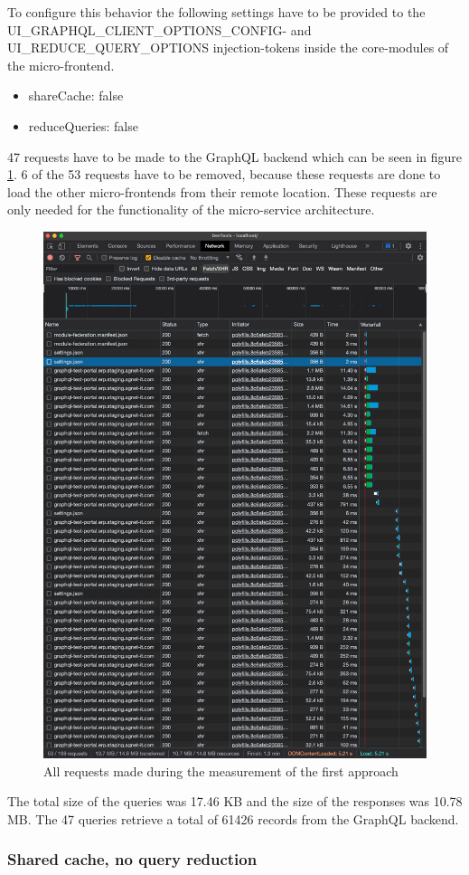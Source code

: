  To configure this behavior the following settings have to be provided to the UI\_GRAPHQL\_CLIENT\_OPTIONS\_CONFIG- and UI\_REDUCE\_QUERY\_OPTIONS injection-tokens inside the core-modules of the micro-frontend.

\begin{itemize}
    \item shareCache: false
    \item reduceQueries: false
\end{itemize}

47 requests have to be made to the GraphQL backend which can be seen in figure \ref{fig:results:no-shared-cache-no-reduction-chrome-dev-tools}. 6 of the 53 requests have to be removed, because these requests are done to load the other micro-frontends from their remote location. These requests are only needed for the functionality of the micro-service architecture.

\ifshowImages
\begin{figure}[H]
\centering
\includegraphics[width=0.6\linewidth]{images/1-attempt/no-shared-cache-no-reduction.png}
\caption{All requests made during the measurement of the first approach}\label{fig:results:no-shared-cache-no-reduction-chrome-dev-tools}
\end{figure}
\fi

The total size of the queries was 17.46 KB and the size of the responses was 10.78 MB. The 47 queries retrieve a total of 61426 records from the GraphQL backend.

\subsubsection{Shared cache, no query reduction}

